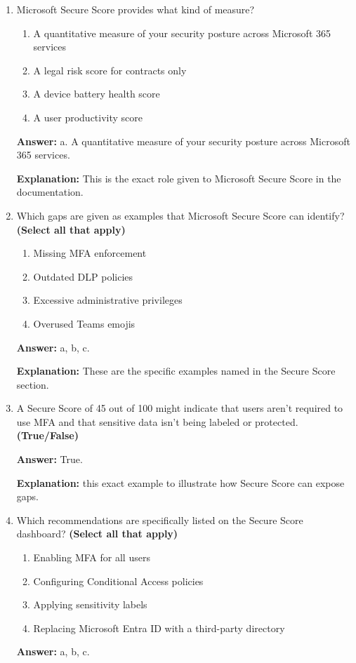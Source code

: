 \documentclass[10pt]{article}
\begin{document}
\begin{enumerate}[leftmargin=*]
\textbf{Explanation:} specifically identifies these two tools as starting points for assessment.

\item Microsoft Secure Score provides what kind of measure?
\begin{enumerate}[label=\alph*., leftmargin=1.5em]
\item A quantitative measure of your security posture across Microsoft 365 services
\item A legal risk score for contracts only
\item A device battery health score
\item A user productivity score
\end{enumerate}
\textbf{Answer:} a. A quantitative measure of your security posture across Microsoft 365 services.

\textbf{Explanation:} This is the exact role given to Microsoft Secure Score in the documentation.

\item Which gaps are given as examples that Microsoft Secure Score can identify? \textbf{(Select all that apply)}
\begin{enumerate}[label=\alph*., leftmargin=1.5em]
\item Missing MFA enforcement
\item Outdated DLP policies
\item Excessive administrative privileges
\item Overused Teams emojis
\end{enumerate}
\textbf{Answer:} a, b, c.

\textbf{Explanation:} These are the specific examples named in the Secure Score section.

\item A Secure Score of 45 out of 100 might indicate that users aren’t required to use MFA and that sensitive data isn’t being labeled or protected. \textbf{(True/False)}

\textbf{Answer:} True.

\textbf{Explanation:} this exact example to illustrate how Secure Score can expose gaps.

\item Which recommendations are specifically listed on the Secure Score dashboard? \textbf{(Select all that apply)}
\begin{enumerate}[label=\alph*., leftmargin=1.5em]
\item Enabling MFA for all users
\item Configuring Conditional Access policies
\item Applying sensitivity labels
\item Replacing Microsoft Entra ID with a third-party directory
\end{enumerate}
\textbf{Answer:} a, b, c.


\end{enumerate}
\end{document}
